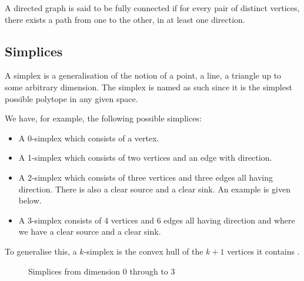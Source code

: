 A directed graph is said to be fully connected if for every pair of distinct vertices, there exists a path from one to the other, in at least one direction.
\subsection{Simplices}
A simplex is a generalisation of the notion of a point, a line, a triangle up to some arbitrary dimension. The simplex is named as such since it is the simplest possible polytope in any given space.

We have, for example, the following possible simplices:

\begin{itemize}
    \item A 0-simplex which consists of a vertex.
    \item A 1-simplex which consists of two vertices and an edge with direction.
    \item A 2-simplex which consists of three vertices and three edges all having direction. There is also a clear source and a clear sink. An example is given below.
    \item A 3-simplex consists of 4 vertices and 6 edges all having direction and where we have a clear source and a clear sink.
\end{itemize}
To generalise this, a $k$-simplex is the convex hull of the $k+1$ vertices it contains \cite{2018}.
\begin{figure}[H]%
    \centering
    \captionsetup{justification=centering}
    \qquad
    \qquad
    \qquad
    \caption{Simplices from dimension 0 through to 3}%
    \label{fig:example}%
\end{figure}

